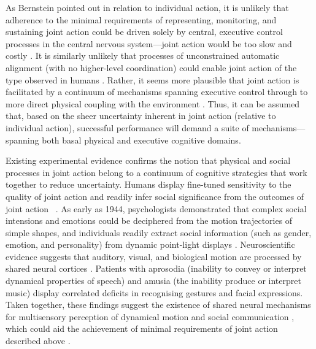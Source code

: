 \begin{CJK}{UTF8}{gbsn}
As Bernstein pointed out in relation to individual action, it is unlikely that adherence to the minimal requirements of representing, monitoring, and sustaining joint action could be driven solely by central, executive control processes in the central nervous system---joint action would be too slow and costly \citep{Dietrich2004b}.  It is similarly unlikely that processes of unconstrained automatic alignment (with no higher-level coordination) could enable joint action of the type observed in humans \citep{Fusaroli2014}.  Rather, it seems more plausible that joint action is facilitated by a continuum of mechanisms spanning executive control through to more direct physical coupling with the environment \citep{Semin2008,Frith2008}.  Thus, it can be assumed that, based on the sheer uncertainty inherent in joint action (relative to individual action), successful performance will demand a suite of mechanisms---spanning both basal physical and executive cognitive domains.

Existing experimental evidence confirms the notion that physical and social processes in joint action belong to a continuum of cognitive strategies that work together to reduce uncertainty.  Humans display fine-tuned sensitivity to the quality of joint action and readily infer social significance from the outcomes of joint action ~\citep{Wheatley2016}.  As early as 1944, psychologists \textcite{Heider1944} demonstrated that complex social intensions and emotions could be deciphered from the motion trajectories of simple shapes, and individuals readily extract social information (such as gender, emotion, and personality) from dynamic point-light displays \citep{Atkinson2004,Johansson1973}.  Neuroscientific evidence suggests that auditory, visual, and biological motion are processed by shared neural cortices \citep[e.g., the right superior temporal cortex; see][]{Zatorre2007,Beaucousin2006,Beauchamp2007}. Patients with aprosodia (inability to convey or interpret dynamical properties of speech) and amusia (the inability produce or interpret music) display correlated deficits in recognising gestures and facial expressions.  Taken together, these findings suggest the existence of shared neural mechanisms for multisensory perception of dynamical motion and social communication \citep{Wheatley2012,Wheatley2016}, which could aid the achievement of minimal requirements of joint action described above \citep{Novembre2014,Sebanz2009}.



\end{CJK}
